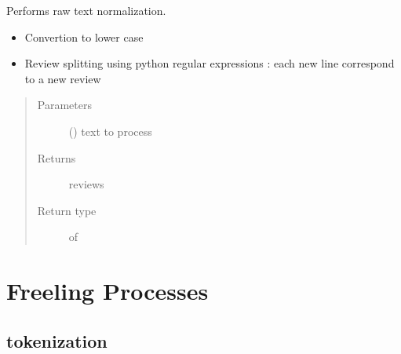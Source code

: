 \documentclass[letterpaper,10pt,english]{sphinxmanual}
\begin{document}
\begin{fulllineitems}
\label{\detokenize{process:loacore.process.review_process.normalize}}
Performs raw text normalization.
\begin{itemize}
\item {} 
Convertion to lower case

\item {} 
Review splitting using python regular expressions : each new line correspond to a new review

\end{itemize}
\begin{quote}\begin{description}
\item[{Parameters}] \leavevmode
{} () \textendash{} text to process

\item[{Returns}] \leavevmode
reviews

\item[{Return type}] \leavevmode
{} of 

\end{description}\end{quote}

\end{fulllineitems}



\section{Freeling Processes}
\label{\detokenize{process:freeling-processes}}

\subsection{tokenization}
\label{\detokenize{process:module-loacore.process.sentence_process}}\label{\detokenize{process:tokenization}}
\end{document}
